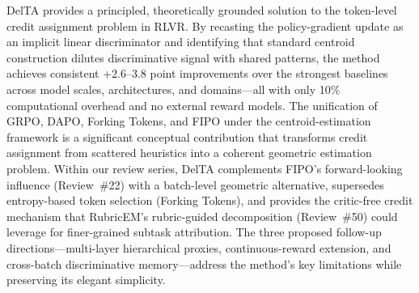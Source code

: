 \documentclass[11pt,a4paper]{article}
\begin{document}
DelTA provides a principled, theoretically grounded solution to the token-level credit assignment problem in RLVR. By recasting the policy-gradient update as an implicit linear discriminator and identifying that standard centroid construction dilutes discriminative signal with shared patterns, the method achieves consistent +2.6--3.8 point improvements over the strongest baselines across model scales, architectures, and domains---all with only 10\% computational overhead and no external reward models. The unification of GRPO, DAPO, Forking Tokens, and FIPO under the centroid-estimation framework is a significant conceptual contribution that transforms credit assignment from scattered heuristics into a coherent geometric estimation problem. Within our review series, DelTA complements FIPO's forward-looking influence (Review~\#22) with a batch-level geometric alternative, supersedes entropy-based token selection (Forking Tokens), and provides the critic-free credit mechanism that RubricEM's rubric-guided decomposition (Review~\#50) could leverage for finer-grained subtask attribution. The three proposed follow-up directions---multi-layer hierarchical proxies, continuous-reward extension, and cross-batch discriminative memory---address the method's key limitations while preserving its elegant simplicity.
\end{document}
